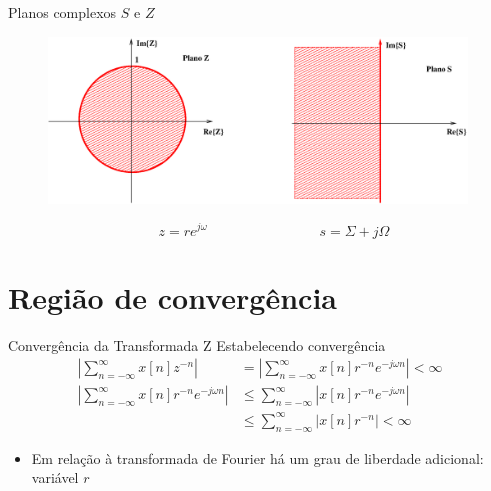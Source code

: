 \begin{slide}{Planos complexos $S$ e $Z$}
\begin{figure}
   \centering
   \includegraphics[width=0.99\textwidth]{figs/planosSZ.eps}
\end{figure}
\begin{equation*}
   \qquad z = re^{j\omega} \qquad\qquad\qquad\qquad s = \Sigma + j\Omega 
\end{equation*}
\end{slide}

\section[slide=true]{Região de convergência}
\begin{slide}{Convergência da Transformada Z}
Estabelecendo convergência
      \begin{align*}
         \left | \sum_{n=-\infty}^\infty x[n]z^{-n}\right| &= \left |\sum_{n=-\infty}^\infty x[n]r^{-n}e^{-j\omega n}\right |<\infty\\
         \left |\sum_{n=-\infty}^\infty x[n]r^{-n}e^{-j\omega n}\right |&\leq  \sum_{n=-\infty}^\infty |x[n]r^{-n}e^{-j\omega n}|\\
                                           &\leq  \sum_{n=-\infty}^\infty |x[n]r^{-n}| < \infty
      \end{align*}
\begin{itemize}
      \item Em relação à transformada de Fourier há um grau de liberdade adicional: variável $r$ 
\end{itemize}

\end{slide}


